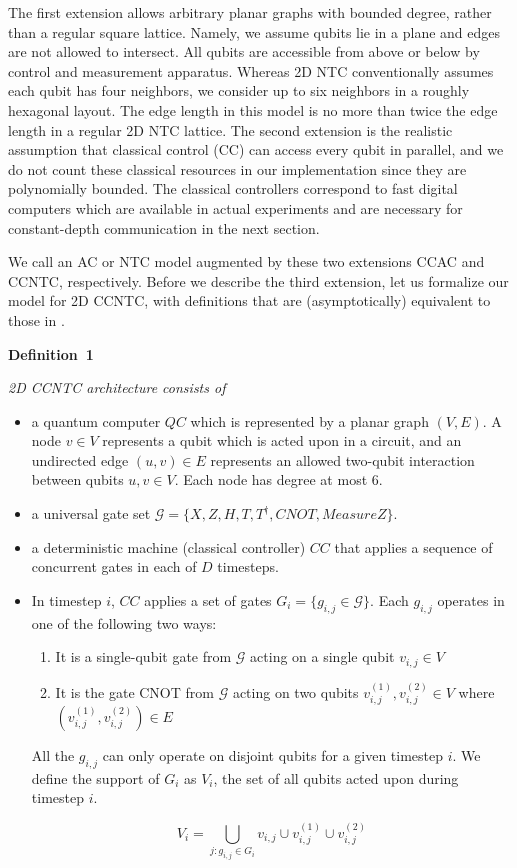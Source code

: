 \documentclass[twoside]{article}
\begin{document}
The first extension allows arbitrary planar graphs
with bounded degree, rather than a regular square lattice.
Namely, we assume qubits lie in a plane and edges are not allowed to intersect.
All qubits are accessible from above
or below by control and measurement apparatus.
Whereas 2D NTC conventionally assumes each qubit
has four neighbors, we consider up to six neighbors in a roughly hexagonal
layout. The edge length in this model is no more than twice the edge length
in a regular 2D NTC lattice. The second extension is the realistic assumption
that classical control (CC) can
access every qubit in parallel, and we do not count these classical
resources in our implementation since they are polynomially bounded. The
classical controllers
correspond to fast digital computers which are
available in actual experiments and are necessary for constant-depth
communication in the next section.

We call an AC or NTC model augmented by these two extensions
\textsc{CCAC} and \textsc{CCNTC}, respectively. Before we describe the
third extension, let us formalize our model for \textsc{2D CCNTC}, with definitions that are (asymptotically) equivalent to those in 
\cite{Rosenbaum2012}.

{\noindent\bf Definition~1} {\it 2D CCNTC architecture consists of

\begin{itemize}
\item a quantum computer $QC$ which is represented by a planar graph $(V,E)$. A
node $v \in V$ represents a qubit which is acted upon in a circuit, and an
undirected edge $(u,v) \in E$ represents 
an allowed two-qubit interaction between qubits $u,v \in V$. Each node has
degree at most $6$.
\item a universal gate set $\mathcal{G} = \{X, Z, H, T, T^{\dagger}, CNOT, MeasureZ\}$.

\item a deterministic machine (classical controller) $CC$ that applies a sequence
of concurrent gates in each of $D$ timesteps.
\item In timestep $i$, $CC$ applies a set of
gates $G_i = \{g_{i,j} \in \mathcal{G} \}$.
Each $g_{i,j}$ operates in one of the following two ways:
\begin{enumerate}
\item It is a single-qubit gate from $\mathcal{G}$ acting on a single qubit $v_{i,j} \in V$
\item
It is the gate CNOT from $\mathcal{G}$ acting on two qubits $v^{(1)}_{i,j}, v^{(2)}_{i,j} \in V$ where
$(v^{(1)}_{i,j}, v^{(2)}_{i,j}) \in E$
\end{enumerate}
All the $g_{i,j}$ can only operate on
disjoint qubits for a given timestep $i$. We define the support of $G_i$
as $V_i$, the set of all qubits acted upon during timestep $i$.

\begin{equation}
V_i = \bigcup_{j: g_{i,j} \in G_i} v_{i,j} \cup v^{(1)}_{i,j} \cup v^{(2)}_{i,j}
\end{equation}

\end{itemize}}
\end{document}
